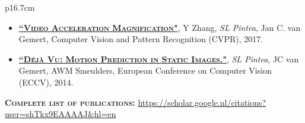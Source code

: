 \documentclass[a4paper, oneside, final]{scrartcl}
\begin{document}
\begin{center}
\begin{tabular}{p{16.7cm}}
\begin{flushleft}
\begin{itemize}
                \item \textsc{\textbf{\href{https://github.com/SilviaLauraPintea/acceleration-magnification.github.io}{``Video Acceleration Magnification"}}}, Y Zhang, \emph{SL Pintea}, Jan C. van Gemert, Computer Vision and Pattern Recognition (CVPR), 2017.\\[3px]
        \item \textsc{\textbf{\href{http://github.com/SilviaLauraPintea/DejaVu}{``D\'{e}j\`{a} Vu: Motion Prediction in Static Images."}}}, \emph{SL Pintea}, JC van Gemert, AWM Smeulders, European Conference on Computer Vision (ECCV), 2014.\\[10px]
            \end{itemize}
            \vspace{5px}
        \textsc{\textbf{Complete list of publications:}} \href{https://scholar.google.nl/citations?user=shTkx9EAAAAJ&hl=en}{https://scholar.google.nl/citations?user=shTkx9EAAAAJ\&hl=en}\\
        \end{flushleft}
		\end{tabular}
	\end{center}
\end{document}
